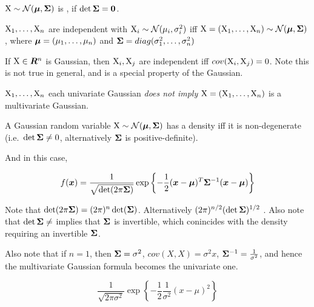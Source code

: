 \begin{defn}
    ${\textnormal{X}} \sim {\mathcal{N}}({\bm{\mu}}, {\bm{\Sigma}})$ is , if $\det {\bm{\Sigma}} = {\bm{0}}$.
\end{defn}

\begin{rem}
    ${\textnormal{X}}_1, \dots, {\textnormal{X}}_n$ are independent with ${\textnormal{X}}_i \sim {\mathcal{N}}(\mu_i, \sigma_i^2)$ iff ${\textnormal{X}} = ({\textnormal{X}}_1, \dots, {\textnormal{X}}_n) \sim {\mathcal{N}}({\bm{\mu}}, {\bm{\Sigma}})$, where ${\bm{\mu}} = (\mu_1, \dots, \mu_n)$ and ${\bm{\Sigma}} = diag(\sigma_1^2, \dots, \sigma_n^2)$
\end{rem}

\begin{thm}
    If ${\textnormal{X}} \in {\bm{R}}^n$ is Gaussian, then ${\textnormal{X}}_i, {\textnormal{X}}_j$ are independent iff $cov({\textnormal{X}}_i, {\textnormal{X}}_j) = 0$. Note this is not true in general, and is a special property of the Gaussian.
\end{thm}

\begin{thm}
    ${\textnormal{X}}_1, \dots, {\textnormal{X}}_n$ each univariate Gaussian \emph{does not imply} ${\textnormal{X}} = ({\textnormal{X}}_1, \dots, {\textnormal{X}}_n)$ is a multivariate Gaussian.
\end{thm}

\begin{thm}
    A Gaussian random variable ${\textnormal{X}} \sim {\mathcal{N}}({\bm{\mu}}, {\bm{\Sigma}})$ has a density iff it is non-degenerate (i.e.\ $\det {\bm{\Sigma}} \neq 0$, alternatively ${\bm{\Sigma}}$ is positive-definite).
    
    And in this case,
    
    \begin{equation}
        f({\bm{x}}) = \frac{1}{\sqrt{\det(2 \pi {\bm{\Sigma}})}} \exp{ \left\{ - \frac{1}{2} ({\bm{x}}- {\bm{\mu}})^T {\bm{\Sigma}}^{-1} ({\bm{x}}- {\bm{\mu}}) \right\} }
    \end{equation}
    
    Note that $\det(2 \pi {\bm{\Sigma}}) = (2\pi)^n \det({\bm{\Sigma}})$. Alternatively $(2 \pi)^{n/2} (\det {\bm{\Sigma}})^{1/2}$ . Also note that $\det {\bm{\Sigma}} \neq$ implies that ${\bm{\Sigma}}$ is invertible, which conincides with the density requiring an invertible ${\bm{\Sigma}}$.
    
    Also note that if $n = 1$, then ${\bm{\Sigma}} = \sigma^2$, $cov(X, X) = \sigma^2 x$, ${\bm{\Sigma}}^{-1} = \frac{1}{\sigma^2}$, and hence the multivariate Gaussian formula becomes the univariate one.
    
    \begin{equation}
        \frac{1}{\sqrt{2 \pi \sigma^2}} \exp{\left\{ - \frac{1}{2} \frac{1}{\sigma^2} (x - \mu)^2\right\}}
    \end{equation}
\end{thm}

